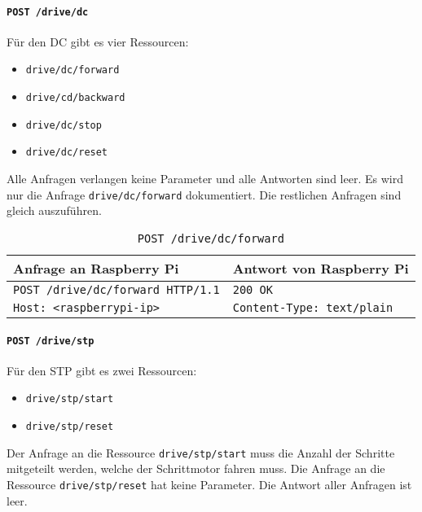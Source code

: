 \paragraph{\texttt{POST /drive/dc}}

Für den DC gibt es vier Ressourcen: 
\begin{itemize}
	\item \texttt{drive/dc/forward}
	\item \texttt{drive/cd/backward}
	\item \texttt{drive/dc/stop}
	\item \texttt{drive/dc/reset}
\end{itemize}
Alle Anfragen verlangen keine Parameter und alle Antworten sind leer. Es wird nur die Anfrage \texttt{drive/dc/forward} dokumentiert. Die restlichen Anfragen sind gleich auszuführen.

\begin{table}[h!]
	\centering
	\begin{tabular}{|l|l|}
		\hline Anfrage an Raspberry Pi & Antwort von Raspberry Pi \\ 
		\hline \texttt{POST /drive/dc/forward HTTP/1.1} & \texttt{200 OK} \\
		\texttt{Host: <raspberrypi-ip>} & \texttt{Content-Type: text/plain} \\
		\hline 
	\end{tabular} 
	\caption{\texttt{POST /drive/dc/forward}}
	\label{tab:post-drive-dc-forward}
\end{table}

\paragraph{\texttt{POST /drive/stp}}

Für den STP gibt es zwei Ressourcen: 
\begin{itemize}
	\item \texttt{drive/stp/start}
	\item \texttt{drive/stp/reset}
\end{itemize}
Der Anfrage an die Ressource \texttt{drive/stp/start} muss die Anzahl der Schritte mitgeteilt werden, welche der Schrittmotor fahren muss. Die Anfrage an die Ressource \texttt{drive/stp/reset} hat keine Parameter. Die Antwort aller Anfragen ist leer.

